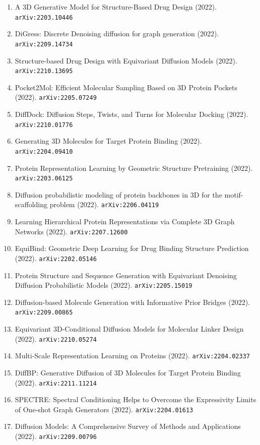 \documentclass[11pt]{article}
\begin{document}
\begin{enumerate}
  \item A 3D Generative Model for Structure-Based Drug Design (2022). \texttt{arXiv:2203.10446}
  \item DiGress: Discrete Denoising diffusion for graph generation (2022). \texttt{arXiv:2209.14734}
  \item Structure-based Drug Design with Equivariant Diffusion Models (2022). \texttt{arXiv:2210.13695}
  \item Pocket2Mol: Efficient Molecular Sampling Based on 3D Protein Pockets (2022). \texttt{arXiv:2205.07249}
  \item DiffDock: Diffusion Steps, Twists, and Turns for Molecular Docking (2022). \texttt{arXiv:2210.01776}
  \item Generating 3D Molecules for Target Protein Binding (2022). \texttt{arXiv:2204.09410}
  \item Protein Representation Learning by Geometric Structure Pretraining (2022). \texttt{arXiv:2203.06125}
  \item Diffusion probabilistic modeling of protein backbones in 3D for the
  motif-scaffolding problem (2022). \texttt{arXiv:2206.04119}
  \item Learning Hierarchical Protein Representations via Complete 3D Graph
  Networks (2022). \texttt{arXiv:2207.12600}
  \item EquiBind: Geometric Deep Learning for Drug Binding Structure Prediction (2022). \texttt{arXiv:2202.05146}
  \item Protein Structure and Sequence Generation with Equivariant Denoising
  Diffusion Probabilistic Models (2022). \texttt{arXiv:2205.15019}
  \item Diffusion-based Molecule Generation with Informative Prior Bridges (2022). \texttt{arXiv:2209.00865}
  \item Equivariant 3D-Conditional Diffusion Models for Molecular Linker Design (2022). \texttt{arXiv:2210.05274}
  \item Multi-Scale Representation Learning on Proteins (2022). \texttt{arXiv:2204.02337}
  \item DiffBP: Generative Diffusion of 3D Molecules for Target Protein Binding (2022). \texttt{arXiv:2211.11214}
  \item SPECTRE: Spectral Conditioning Helps to Overcome the Expressivity Limits
  of One-shot Graph Generators (2022). \texttt{arXiv:2204.01613}
  \item Diffusion Models: A Comprehensive Survey of Methods and Applications (2022). \texttt{arXiv:2209.00796}

\end{enumerate}
\end{document}
